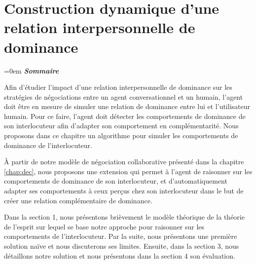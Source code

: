 \chapter{Construction dynamique d'une relation interpersonnelle de dominance}
\label{chap:Tom}
\begingroup
\parindent=0em
\emph{\textbf{Sommaire}}
\localtableofcontents 
\clearpage
\endgroup

Afin d'étudier l'impact d'une relation interpersonnelle de dominance sur les stratégies de négociations entre un agent conversationnel et un humain, l'agent doit être en mesure de simuler une relation de dominance entre lui et l'utilisateur humain. Pour ce faire, l'agent doit détecter les comportements de dominance de son interlocuteur afin d'adapter son comportement en complémentarité. Nous proposons dans ce chapitre un algorithme pour simuler les comportements de dominance de l'interlocuteur. 

À partir de notre modèle de négociation collaborative présenté dans la chapitre \ref{chap:dec}, nous proposons une extension qui permet à l'agent de raisonner sur les comportements de dominance de son interlocuteur, et d'automatiquement adapter ses comportements à ceux perçus chez son interlocuteur dans le but de créer une relation complémentaire de dominance.

Dans la section 1, nous présentons brièvement le modèle théorique de la théorie de l'esprit sur lequel se base notre approche pour raisonner sur les comportements de l'interlocuteur. Par la suite, nous présentons une première solution naïve et nous discuterons ses limites. Ensuite, dans la section 3, nous détaillons notre solution et nous présentons dans la section 4 son évaluation.  


